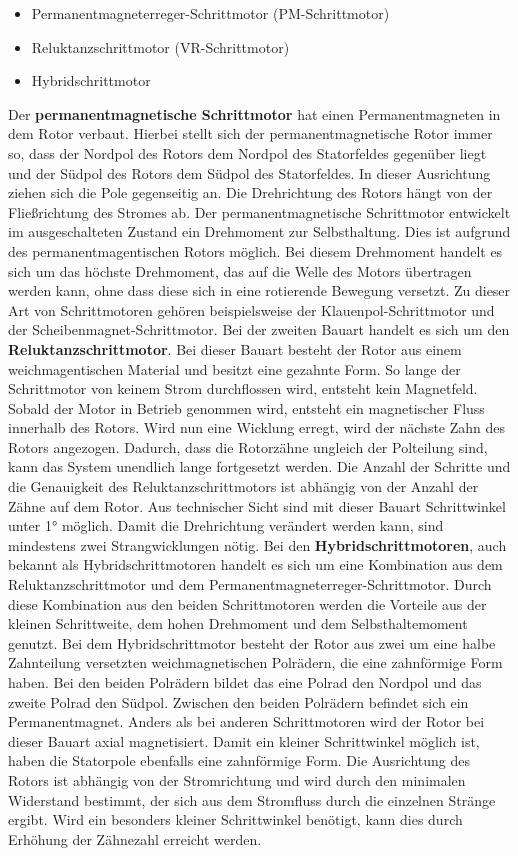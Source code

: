 \begin{itemize}
	\item {Permanentmagneterreger-Schrittmotor (PM-Schrittmotor)}
	\item {Reluktanzschrittmotor (VR-Schrittmotor)}
	\item {Hybridschrittmotor}
\end{itemize}

Der \textbf{permanentmagnetische Schrittmotor} hat einen Permanentmagneten in dem Rotor verbaut. Hierbei stellt sich der permanentmagnetische Rotor immer so, dass der Nordpol des Rotors dem Nordpol des Statorfeldes gegenüber liegt und der Südpol des Rotors dem Südpol des Statorfeldes. In dieser Ausrichtung ziehen sich die Pole gegenseitig an. Die Drehrichtung des Rotors hängt von der Fließrichtung des Stromes ab. Der permanentmagnetische Schrittmotor entwickelt im ausgeschalteten Zustand ein Drehmoment zur Selbsthaltung. Dies ist aufgrund des permanentmagentischen Rotors möglich. Bei diesem Drehmoment handelt es sich um das höchste Drehmoment, das auf die Welle des Motors übertragen werden kann, ohne dass diese sich in eine rotierende Bewegung versetzt. Zu dieser Art von Schrittmotoren gehören beispielsweise der Klauenpol-Schrittmotor und der Scheibenmagnet-Schrittmotor. Bei der zweiten Bauart handelt es sich um den \textbf{Reluktanzschrittmotor}. Bei dieser Bauart besteht der Rotor aus einem weichmagentischen Material und besitzt eine gezahnte Form. So lange der Schrittmotor von keinem Strom durchflossen wird, entsteht kein Magnetfeld. Sobald der Motor in Betrieb genommen wird, entsteht ein magnetischer Fluss innerhalb des Rotors. Wird nun eine Wicklung erregt, wird der nächste Zahn des Rotors angezogen. Dadurch, dass die Rotorzähne ungleich der Polteilung sind, kann das System unendlich lange fortgesetzt werden. Die Anzahl der Schritte und die Genauigkeit des Reluktanzschrittmotors ist abhängig von der Anzahl der Zähne auf dem Rotor. Aus technischer Sicht sind mit dieser Bauart Schrittwinkel unter 1° möglich. Damit die Drehrichtung verändert werden kann, sind mindestens zwei Strangwicklungen nötig. Bei den \textbf{Hybridschrittmotoren}, auch bekannt als Hybridschrittmotoren handelt es sich um eine Kombination aus dem Reluktanzschrittmotor und dem Permanentmagneterreger-Schrittmotor. Durch diese Kombination aus den beiden Schrittmotoren werden die Vorteile aus der kleinen Schrittweite, dem hohen Drehmoment und dem Selbsthaltemoment genutzt. Bei dem Hybridschrittmotor besteht der Rotor aus zwei um eine halbe Zahnteilung versetzten weichmagnetischen Polrädern, die eine zahnförmige Form haben. Bei den beiden Polrädern bildet das eine Polrad den Nordpol und das zweite Polrad den Südpol. Zwischen den beiden Polrädern befindet sich ein Permanentmagnet. Anders als bei anderen Schrittmotoren wird der Rotor bei dieser Bauart axial magnetisiert. Damit ein kleiner Schrittwinkel möglich ist, haben die Statorpole ebenfalls eine zahnförmige Form. Die Ausrichtung des Rotors ist abhängig von der Stromrichtung und wird durch den minimalen Widerstand bestimmt, der sich aus dem Stromfluss durch die einzelnen Stränge ergibt. Wird ein besonders kleiner Schrittwinkel benötigt, kann dies durch Erhöhung der Zähnezahl erreicht werden. \cite{Schroder.2021} \cite{Hagl.2021} \cite{Babiel.2023}

